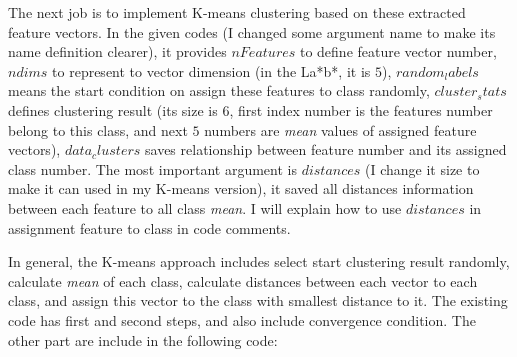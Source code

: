 \documentclass[12pt]{article}
\begin{document}
The next job is to implement K-means clustering based on these extracted feature vectors. In the given codes (I changed some argument name to make its name definition clearer), it provides $nFeatures$ to define feature vector number, $ndims$ to represent to vector dimension (in the La*b*, it is $5$), $random_labels$ means the start condition on assign these features to class randomly, $cluster_stats$ defines clustering result (its size is $6$, first index number is the features number belong to this class, and next $5$ numbers are \textit{mean} values of assigned feature vectors), $data_clusters$ saves relationship between feature number and its assigned class number. The most important argument is $distances$ (I change it size to make it can used in my K-means version), it saved all distances information between each feature to all class \textit{mean}. I will explain how to use $distances$ in assignment feature to class in code comments.

In general, the K-means approach includes select start clustering result randomly, calculate \textit{mean} of each class, calculate distances between each vector to each class, and assign this vector to the class with smallest distance to it. The existing code has first and second steps, and also include convergence condition. The other part are include in the following code:
\end{document}

